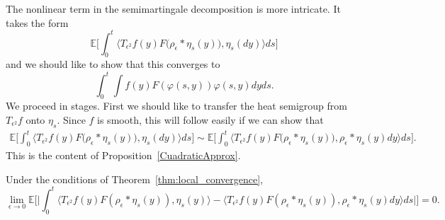 \documentclass[EJP]{ejpecp} %
\newcommand{\IE}{\mathbb E}
\begin{document}
The nonlinear term in the semimartingale decomposition is more intricate. 
It takes the form
\[ %
\IE\Big[
\int_0^t\big\langle T_{\epsilon^2} f(y) F\big(\rho_\epsilon *\eta_s(y)\big), 
\eta_s(dy) \big\rangle ds\Big]
\]
and we should like to show that this converges to 
	\[
		\int_0^t\int f(y)F(\varphi(s,y))\varphi(s,y)dyds.
	\]
	We proceed in stages. First we should like to transfer the 
	heat semigroup from $T_{\epsilon^2}f$ onto $\eta_s$. 
	Since $f$ is smooth, this will follow easily if we can show that
\begin{align*}
\IE\Big[
\int_0^t\big\langle T_{\epsilon^2} f(y) F\big(\rho_\epsilon *\eta_s(y)\big), 
\eta_s(dy) \big\rangle ds\Big]
	\sim 
\IE\Big[
\int_0^t\big\langle T_{\epsilon^2} f(y) F\big(\rho_\epsilon * \eta_s(y)\big), 
\rho_\epsilon * \eta_s(y) dy \big\rangle ds\Big].
\end{align*}
This is the content of Proposition~\ref{CuadraticApprox}. 

\begin{proposition} 
\label{CuadraticApprox}
Under the conditions of Theorem~\ref{thm:local_convergence},
\begin{equation}
\label{replacing nonlinear term}
\lim_{\epsilon\to 0}\IE\Big[\Big|\int_0^t\big\langle T_{\epsilon^2} f(y) 
F(\rho_\epsilon *\eta_s(y)), \eta_s(y) \big\rangle 
- \big\langle T_{\epsilon^2} f(y) 
F(\rho_\epsilon * \eta_s(y)), \rho_\epsilon * \eta_s(y) dy 
\big\rangle ds \Big|\Big]
=0.
\end{equation}
\end{proposition}
\end{document}
